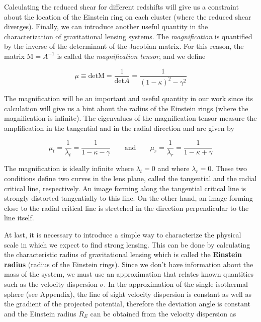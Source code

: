 Calculating the reduced shear for different redshifts will give us a constraint about the location of the Einstein ring on each cluster (where the reduced shear diverges). Finally, we can introduce another useful quantity in the characterization of gravitational lensing systems. The \textit{magnification} is quantified by the inverse of the determinant of the Jacobian matrix. For this reason, the matrix $\text{M}=A^{-1}$ is called the \textit{magnification tensor}, and we define

\begin{equation}
\mu \equiv \text{det} \text{M} = \frac{1}{\text{det}A}=\frac{1}{(1-\kappa)^2-\gamma^2}
\end{equation}

The magnification will be an important and useful quantity in our work since its calculation will give us a hint about the radius of the Einstein rings (where the magnification is infinite). The eigenvalues of the magnification tensor measure the amplification in the tangential and in the radial direction and are given by

\begin{equation}
\mu_t = \frac{1}{\lambda_t}=\frac{1}{1-\kappa - \gamma} \qquad \text{and} \qquad  \mu_r = \frac{1}{\lambda_r}=\frac{1}{1-\kappa + \gamma}
\end{equation}

The magnification is ideally infinite where $\lambda_t=0$ and where $\lambda_r=0$. These two conditions define two curves in the lens plane, called the tangential and the radial critical line, respectively. An image forming along the tangential critical line is strongly distorted tangentially to this line. On the other hand, an image forming close to the radial critical line is stretched in the direction perpendicular to the line itself. 

At last, it is necessary to introduce a simple way to characterize the physical scale in which we expect to find strong lensing. This can be done by calculating the characteristic radius of gravitational lensing which is called the \textbf{Einstein radius} (radius of the Einstein rings). Since we don't have information about the mass of the system, we must use an approximation that relates known quantities such as the velocity dispersion $\sigma$. In the approximation of the single isothermal sphere (see Appendix), the line of sight velocity dispersion is constant as well as the gradient of the projected potential, therefore the deviation angle is constant and the Einstein radius $R_{E}$ can be obtained from the velocity dispersion as

